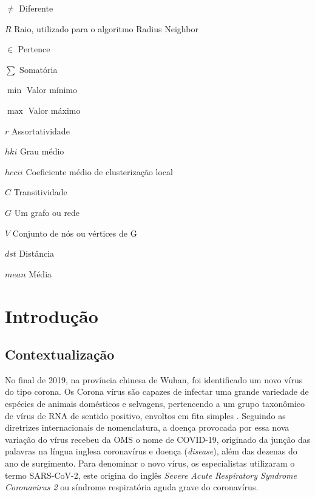 \documentclass[
12pt,        %
oneside,     %
a4paper,     %
english,       %
brazil        %
%
%
]{ppgca}
\begin{document}
\begin{simbolos}
  \item[$ \neq $] Diferente
  \item[$ R $] Raio, utilizado para o algoritmo Radius Neighbor
  \item[$ \in $] Pertence
  \item[$ \sum $] Somatória
  \item[$ \min $] Valor mínimo
  \item[$ \max $] Valor máximo
  \item[$ r $] Assortatividade
  \item[$ hki $] Grau médio
  \item[$ hccii $] Coeficiente médio de clusterização local
  \item[$ C $] Transitividade
  \item[$ G $] Um grafo ou rede
  \item[$ V $] Conjunto de nós ou vértices de G
  \item[$ dst $] Distância
  \item[$ mean $] Média
\end{simbolos}

\tableofcontents*
\cleardoublepage
\textual

\chapter [Introdução]{Introdução} %

\section{Contextualização}
No final de 2019, na província chinesa de Wuhan, foi identificado um novo vírus do tipo corona. Os Corona vírus são capazes de infectar uma grande variedade de espécies de animais domésticos e selvagens, pertencendo a um grupo taxonômico de vírus de RNA de sentido positivo, envoltos em fita simples \cite{MILLET2015}. Seguindo as diretrizes internacionais de nomenclatura, a doença provocada por essa nova variação do vírus recebeu da OMS o nome de COVID-19, originado da junção das palavras na língua inglesa coronavírus e doença (\textit{disease}), além das dezenas do ano de surgimento. Para denominar o novo vírus, os especialistas utilizaram o termo SARS-CoV-2, este origina do inglês \textit{Severe Acute Respiratory Syndrome Coronavirus 2} ou síndrome respiratória aguda grave do coronavírus. 
\end{document}
